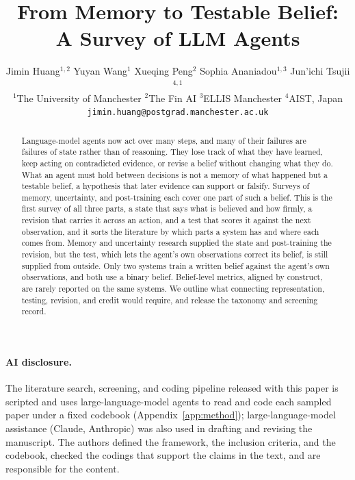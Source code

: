 \documentclass[11pt]{article}
\title{From Memory to Testable Belief: A Survey of LLM Agents}
\author{Jimin Huang$^{1,2}$ \quad Yuyan Wang$^{1}$ \quad Xueqing Peng$^{2}$ \quad Sophia Ananiadou$^{1,3}$ \quad Jun'ichi Tsujii$^{4,1}$ \\[2pt]
{\normalsize $^1$The University of Manchester \quad $^2$The Fin AI \quad $^3$ELLIS Manchester \quad $^4$AIST, Japan} \\[2pt]
{\normalsize\texttt{jimin.huang@postgrad.manchester.ac.uk}}}
\begin{document}
\maketitle

\begin{abstract}
Language-model agents now act over many steps, and many of their failures are failures of state rather than of reasoning. They lose track of what they have learned, keep acting on contradicted evidence, or revise a belief without changing what they do. What an agent must hold between decisions is not a memory of what happened but a testable belief, a hypothesis that later evidence can support or falsify. Surveys of memory, uncertainty, and post-training each cover one part of such a belief. This is the first survey of all three parts, a state that says what is believed and how firmly, a revision that carries it across an action, and a test that scores it against the next observation, and it sorts the literature by which parts a system has and where each comes from. Memory and uncertainty research supplied the state and post-training the revision, but the test, which lets the agent's own observations correct its belief, is still supplied from outside. Only two systems train a written belief against the agent's own observations, and both use a binary belief. Belief-level metrics, aligned by construct, are rarely reported on the same systems. We outline what connecting representation, testing, revision, and credit would require, and release the taxonomy and screening record.
\end{abstract}

\paragraph{AI disclosure.}
The literature search, screening, and coding pipeline released with this paper is scripted and uses large-language-model agents to read and code each sampled paper under a fixed codebook (Appendix~\ref{app:method}); large-language-model assistance (Claude, Anthropic) was also used in drafting and revising the manuscript. The authors defined the framework, the inclusion criteria, and the codebook, checked the codings that support the claims in the text, and are responsible for the content.












\end{document}
